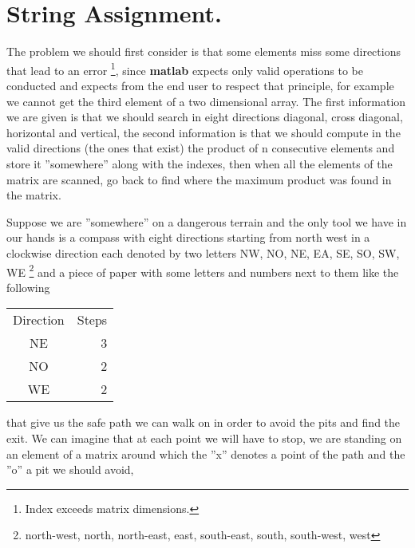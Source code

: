 \documentclass[10pt]{article}
\begin{document}
\section{String Assignment.} The problem we should first consider is that some elements 
miss some directions that lead to an error \footnote{Index  exceeds matrix dimensions.}, 
since {\color{red}\textbf{matlab}} expects only valid operations to be conducted and 
expects from the end user to respect that principle, for example we cannot get the third 
element of a two dimensional array. The first information we are given  is that we should 
search in eight directions diagonal, cross diagonal, horizontal and vertical, the second 
information is that we should compute in the valid directions (the ones that exist) the 
product of n  consecutive elements and store it ''somewhere'' along with the indexes, 
then when all the elements of the matrix are scanned, go back to find where the maximum 
product was found in the matrix.\par
Suppose we are ''somewhere'' on a dangerous terrain and the only tool we have in our 
hands is a compass with eight directions starting from north west in a clockwise 
direction each denoted by two letters  NW, NO, NE, EA, SE, SO, SW, WE 
\footnote{north-west, north, north-east, east, south-east, south, south-west, west}  and 
a piece of paper with some letters and numbers next to them like the following 
\begin{center}\begin{tabular}{c|r}Direction & Steps \\ NE & 3\\NO&2\\WE & 
2\end{tabular}\end{center}that give us the safe path we can walk on in order  to avoid 
the pits and find the exit. We can imagine that at each point we will have to  stop, we 
are standing on an element of a matrix around which the ''x'' denotes a point of the path 
and 
the ''o'' a pit we should avoid,\vspace{15pt}
\end{document}

